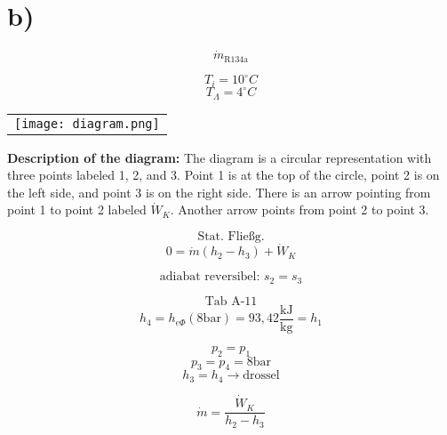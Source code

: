 

\section*{b)}

\[
\dot{m}_{\text{R134a}}
\]

\[
T_i = 10^\circ C
\]
\[
T_{\Lambda} = 4^\circ C
\]

\begin{center}
\begin{tabular}{c}
\texttt{[image: diagram.png]}
\end{tabular}
\end{center}

\textbf{Description of the diagram:} The diagram is a circular representation with three points labeled 1, 2, and 3. Point 1 is at the top of the circle, point 2 is on the left side, and point 3 is on the right side. There is an arrow pointing from point 1 to point 2 labeled $\dot{W}_K$. Another arrow points from point 2 to point 3.

\[
\text{Stat. Fließg.}
\]
\[
0 = \dot{m} (h_2 - h_3) + \dot{W}_K
\]

\[
\text{adiabat reversibel: } s_2 = s_3
\]

\[
\text{Tab A-11}
\]
\[
h_4 = h_{e\Phi}(8 \text{bar}) = 93,42 \frac{\text{kJ}}{\text{kg}} = h_1
\]

\[
p_2 = p_1
\]
\[
p_3 = p_4 = 8 \text{bar}
\]
\[
h_3 = h_4 \rightarrow \text{drossel}
\]

\[
\dot{m} = \frac{\dot{W}_K}{h_2 - h_3}
\]